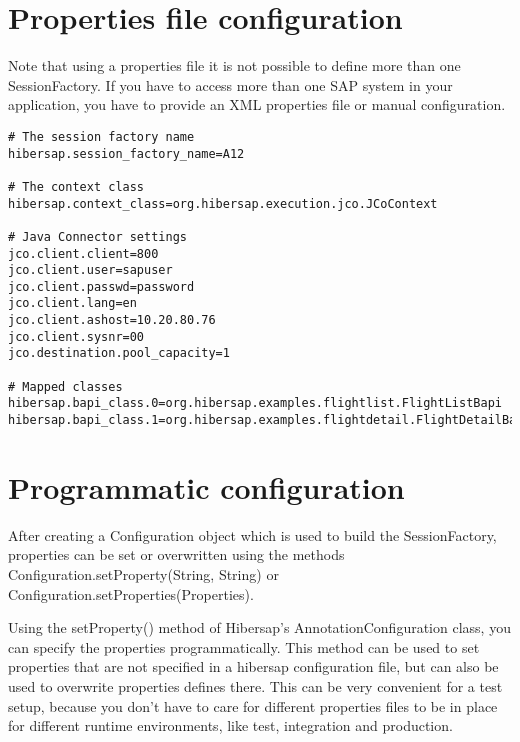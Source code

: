 \section{Properties file configuration}

Note that using a properties file it is not possible to define more than one SessionFactory. If you have to access more
than one SAP system in your application, you have to provide an XML properties file or manual configuration.

\begin{Verbatim}[frame=single,label=hibersap.properties]
# The session factory name
hibersap.session_factory_name=A12

# The context class
hibersap.context_class=org.hibersap.execution.jco.JCoContext

# Java Connector settings
jco.client.client=800
jco.client.user=sapuser
jco.client.passwd=password
jco.client.lang=en
jco.client.ashost=10.20.80.76
jco.client.sysnr=00
jco.destination.pool_capacity=1

# Mapped classes
hibersap.bapi_class.0=org.hibersap.examples.flightlist.FlightListBapi
hibersap.bapi_class.1=org.hibersap.examples.flightdetail.FlightDetailBapi
\end{Verbatim}


\section{Programmatic configuration}

After creating a Configuration object
which is used to build the SessionFactory, properties can be set or overwritten using the methods
Configuration.setProperty(String, String) or Configuration.setProperties(Properties).

Using the setProperty() method of Hibersap's AnnotationConfiguration class, you can specify the properties
programmatically. This method can be used to set properties that are not specified in a hibersap configuration file, but
can also be used to overwrite properties defines there. This can be very convenient for a test setup, because you
don't have to care for different properties files to be in place for different runtime environments, like test,
integration and production.




